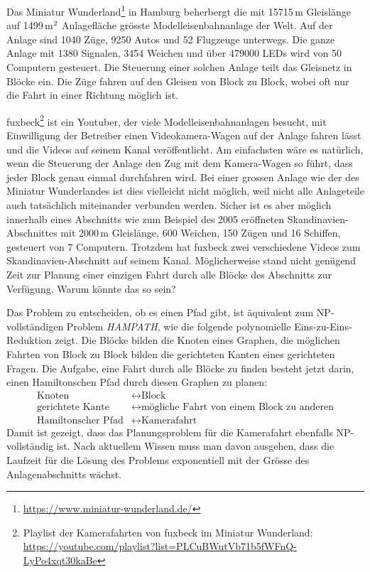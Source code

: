 Das Miniatur Wunderland\footnote{\url{https://www.miniatur-wunderland.de/}}
in Hamburg beherbergt die mit
15715\,m Gleislänge auf 1499\,m$\mathstrut^2$ Anlagefläche grösste
Modelleisenbahnanlage der Welt.
Auf der Anlage sind 1040 Züge, 9250 Autos und 52 Flugzeuge unterwegs.
Die ganze Anlage mit 1380 Signalen, 3454 Weichen und über 479000 LEDs
wird von 50 Computern gesteuert.
Die Steuerung einer solchen Anlage teilt das Gleisnetz in Blöcke ein.
Die Züge fahren auf den Gleisen von Block zu Block, wobei oft nur
die Fahrt in einer Richtung möglich ist.

fuxbeck\footnote{Playlist der Kamerafahrten von fuxbeck im Miniatur Wunderland:
\url{https://youtube.com/playlist?list=PLCuBWutVb71b5fWFnQ-LyPo4xqt30kaBe}}
ist ein Youtuber, der viele Modelleisenbahnanlagen besucht,
mit Einwilligung der Betreiber einen Videokamera-Wagen auf der Anlage
fahren lässt und die Videos auf seinem Kanal veröffentlicht.
Am einfachsten wäre es natürlich, wenn die Steuerung der Anlage den Zug
mit dem Kamera-Wagen so führt, dass jeder Block genau einmal durchfahren
wird.
Bei einer grossen Anlage wie der des Miniatur Wunderlandes ist dies
vielleicht nicht möglich, weil nicht alle Anlageteile auch tatsächlich
miteinander verbunden werden.
Sicher ist es aber möglich innerhalb eines Abschnitts wie zum Beispiel
des 2005 eröffneten Skandinavien-Abschnittes mit 2000\,m Gleislänge,
600 Weichen, 150 Zügen und 16 Schiffen, gesteuert von 7 Computern.
Trotzdem hat fuxbeck zwei verschiedene Videos zum Skandinavien-Abschnitt
auf seinem Kanal.
Möglicherweise stand nicht genügend Zeit zur Planung einer einzigen Fahrt
durch alle Blöcke des Abschnitts zur Verfügung.
Warum könnte das so sein?


\begin{loesung}
Das Problem zu entscheiden, ob es einen Pfad gibt, ist äquivalent zum
NP-vollständigen Problem \textsl{HAMPATH}, wie die folgende polynomielle
Eins-zu-Eins-Reduktion zeigt.
Die Blöcke bilden die Knoten eines Graphen, die möglichen Fahrten von Block
zu Block bilden die gerichteten Kanten eines gerichteten Fragen.
Die Aufgabe, eine Fahrt durch alle Blöcke zu finden besteht jetzt darin,
einen Hamiltonschen Pfad durch diesen Graphen zu planen:
\begin{align*}
\text{Knoten} &\leftrightarrow \text{Block}
\\
\text{gerichtete Kante} &\leftrightarrow \text{mögliche Fahrt von einem Block zu anderen}
\\
\text{Hamiltonscher Pfad}&\leftrightarrow \text{Kamerafahrt}
\end{align*}
Damit ist gezeigt, dass das Planungsproblem für die Kamerafahrt ebenfalls
NP-vollständig ist.
Nach aktuellem Wissen muss man davon ausgehen, dass die Laufzeit für die
Lösung des Problems exponentiell mit der Grösse des Anlagenabschnitts
wächst.
\end{loesung}

